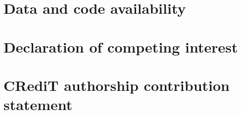 \documentclass[final,1p,times]{elsarticle}
\begin{document}
\section*{Data and code availability}

\section*{Declaration of competing interest}

\section*{CRediT authorship contribution statement}



\end{document}
